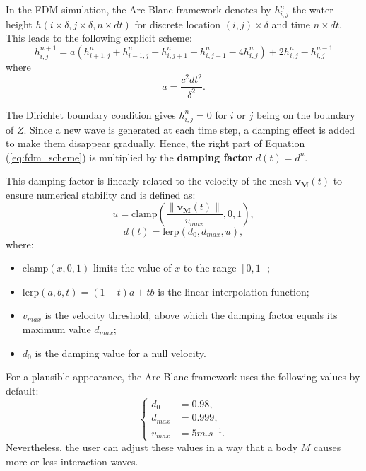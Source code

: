 \documentclass[final]{jcgt}
\def\framework{the Arc Blanc framework\xspace}
\begin{document}
In the FDM simulation, \framework denotes by $h_{i,j}^n$ the water height $h(i\times \delta,j\times \delta,n \times dt)$ for discrete location $(i,j)\times \delta$ and time $n\times dt$.
This leads to the following explicit scheme:
\begin{equation}
	\label{eq:fdm_scheme}
	h_{i,j}^{n+1} = a\left(h_{i+1,j}^n+h_{i-1,j}^n+h_{i,j+1}^n+h_{i,j-1}^n-4h_{i,j}^n\right) + 2h_{i,j}^n - h_{i,j}^{n-1}
\end{equation}
where
\begin{equation}
	a=\frac{c^2dt^2}{\delta^2}.
\end{equation}

The Dirichlet boundary condition gives $h_{i,j}^n=0$ for $i$ or $j$ being on the boundary of $Z$. Since a new wave is generated at each time step, a damping effect is added to make them disappear gradually. Hence, the right part of Equation (\ref{eq:fdm_scheme}) is multiplied by the \textbf{damping factor} $d(t) = d^n$. 

This damping factor is linearly related to the velocity of the mesh $\mathbf{v_M}(t)$ to ensure numerical stability and is defined as:
\begin{equation*}
u = \text{clamp}\left(\frac{\|\mathbf{v_M}(t)\|}{v_{max}}, 0, 1\right),
\end{equation*}
\begin{equation}
d(t) = \text{lerp}(d_0, d_{max}, u),
\end{equation}
where:
\begin{itemize}
	\item $\text{clamp}(x, 0, 1)$ limits the value of $x$ to the range $[0, 1]$;
	\item $\text{lerp}(a, b, t) = (1-t)a + tb$ is the linear interpolation function;
	\item $v_{max}$ is the velocity threshold, above which the damping factor equals its maximum value $d_{max}$;
	\item $d_0$ is the damping value for a null velocity.
\end{itemize}

For a plausible appearance, \framework uses the following values by default:
\begin{equation}
	\begin{cases}
		d_0     & = 0.98,       \\
		d_{max} & = 0.999,      \\
		v_{max} & = 5 m.s^{-1}.
	\end{cases}
\end{equation}
Nevertheless, the user can adjust these values in a way that a body $M$ causes more or less interaction waves.
\end{document}
